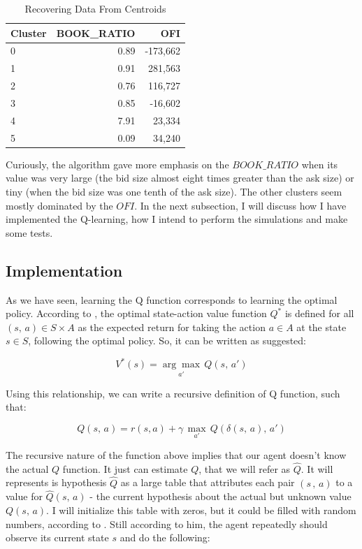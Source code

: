 \documentclass[a4paper]{article}
\begin{document}
\begin{table}[ht!]
\centering
\begin{tabular}{l|rr}
{Cluster} &    BOOK\_RATIO &    OFI \\
\midrule
0 &  0.89 &  -173,662 \\
1 &  0.91 &  281,563 \\
2 &  0.76 &  116,727 \\
3 &  0.85 &  -16,602 \\
4 &  7.91 &  23,334 \\
5 &  0.09 &  34,240 \\

\end{tabular}
\caption{\label{tab:cluster_recover}Recovering Data From Centroids}
\end{table}

Curiously, the algorithm gave more emphasis on the $BOOK\_RATIO$  when its value was very large (the bid size almost eight times greater than the ask size) or tiny (when the bid size was one tenth of the ask size). The other clusters seem mostly dominated by the $OFI$. In the next subsection, I will discuss how I have implemented the Q-learning, how I intend to perform the simulations and make some tests.


\subsection{Implementation}
As we have seen, learning the Q function corresponds to learning the optimal policy. According to \cite{Mohri_2012}, the optimal state-action value function $Q^{*}$ is defined for all $(s, \, a) \in S \times A$ as the expected return for taking the action $a \in A$ at the state $s \in S$, following the optimal policy. So, it can be written as \cite{Mitchell} suggested:

$$V^{*}(s) = \underset{a'}{\arg \max} \, Q(s, \, a')$$

Using this relationship, we can write a recursive definition of Q function, such that:

$$Q(s, \, a) = r(s, a) + \gamma \, \underset{a'}{\max} \, Q(\delta(s,\, a), \, a')$$

The recursive nature of the function above implies that our agent doesn't know the actual $Q$ function. It just can estimate $Q$, that we will refer as $\hat{Q}$. It will represents is hypothesis $\hat{Q}$ as a large table that attributes each pair $(s\, , \, a)$ to a value for $\hat{Q}(s,\, a)$ - the current hypothesis about the actual but unknown value $Q(s, \, a)$. I will initialize this table with zeros, but it could be filled with random numbers, according to \cite{Mitchell}. Still according to him, the agent repeatedly should observe its current state $s$ and do the following:
\end{document}
